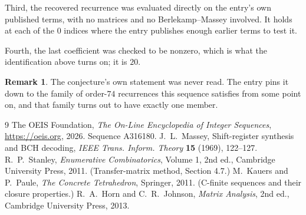 \documentclass[11pt,a4paper]{article}
\theoremstyle{plain}
\theoremstyle{definition}
\newtheorem{remark}[theorem]{Remark}
\begin{document}
Third, the recovered recurrence was evaluated directly on the entry's own published terms, with
no matrices and no Berlekamp--Massey involved. It holds at each of the $0$ indices where
the entry publishes enough earlier terms to test it.

Fourth, the last coefficient was checked to be nonzero, which is what the identification above
turns on; it is $20$.

\begin{remark}
The conjecture's own statement was never read. The entry pins it down to the family of
order-$74$ recurrences this sequence satisfies from some point on, and that family turns
out to have exactly one member.
\end{remark}

\begin{thebibliography}{9}
 The OEIS Foundation, \emph{The On-Line Encyclopedia of Integer
Sequences}, \url{https://oeis.org}, 2026. Sequence A316180.
 J.~L.~Massey, Shift-register synthesis and BCH decoding, \emph{IEEE
Trans. Inform. Theory} \textbf{15} (1969), 122--127.
 R.~P.~Stanley, \emph{Enumerative Combinatorics}, Volume 1, 2nd ed.,
Cambridge University Press, 2011. (Transfer-matrix method, Section 4.7.)
 M.~Kauers and P.~Paule, \emph{The Concrete Tetrahedron}, Springer, 2011.
(C-finite sequences and their closure properties.)
 R.~A.~Horn and C.~R.~Johnson, \emph{Matrix Analysis}, 2nd ed., Cambridge
University Press, 2013.
\end{thebibliography}
\end{document}
